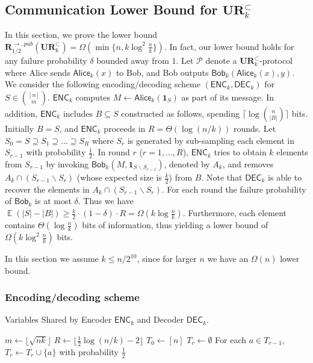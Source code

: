 \documentclass[11pt]{article}
\DeclareMathOperator*{\E}{\mathbb{E}}
\newcommand{\enc}{\textsf{ENC}\xspace}
\newcommand{\dec}{\textsf{DEC}\xspace}
\newcommand{\sketch}{\mathsf{Alice}}
\newcommand{\query}{\mathsf{Bob}}
\newcommand{\ur}{\mathbf{UR}\xspace}
\newcommand{\randcom}{\mathbf{R}}
\begin{document}
\subsection{Communication Lower Bound for $\ur_k^\subset$}\label{sec:k-samples-lb}

In this section, we prove the lower bound $\randcom^{\rightarrow,pub}_{1/2}(\ur^\subset_k) = \Omega(\min\{n, k\log^2 \frac{n}{k}\})$. In fact, our lower bound holds for any failure probability $\delta$ bounded away from $1$. Let $\mathcal{P}$ denote a $\ur_k^\subset$-protocol where Alice sends $\sketch_k(x)$ to Bob, and Bob outputs $\query_k(\sketch_k(x), y)$.  We consider the following encoding/decoding scheme $(\enc_k, \dec_k)$ for $S\in {[n] \choose m}$.  $\enc_k$ computes $M\leftarrow \sketch_k(\mathbf{1}_S)$ as part of its message. In addition, $\enc_k$ includes $B\subseteq S$ constructed as follows, spending $\lceil\log{n\choose |B|}\rceil$ bits.  Initially $B= S$, and $\enc_k$ proceeds in $R=\Theta(\log (n/k))$ rounds.  Let $S_0=S\supseteq S_1\supseteq \ldots \supseteq S_R$ where $S_r$ is generated by sub-sampling each element in $S_{r-1}$ with probability $\frac{1}{2}$.  In round $r$ ($r=1,\ldots, R$), $\enc_k$ tries to obtain $k$ elements from $S_{r-1}$ by invoking $\query_k(M, \mathbf{1}_{S\backslash S_{r-1}})$, denoted by $A_k$, and removes $A_k\cap (S_{r-1}\backslash S_{r})$ (whose expected size is $\frac{k}{2}$) from $B$.  Note that $\dec_k$ is able to recover the elements in $A_k\cap (S_{r-1}\backslash S_{r})$.  For each round the failure probability of $\query_k$ is at most $\delta$.  Thus we have $\E(|S|-|B|)\ge \frac{k}{2}\cdot (1-\delta) \cdot R=\Omega(k\log\frac{n}{k})$.  Furthermore, each element contains $\Theta(\log \frac{n}{k})$ bits of information, thus yielding a lower bound of $\Omega(k\log^2\frac{n}{k})$ bits.

In this section we assume $k \le n/2^{10}$, since for larger $n$ we have an $\Omega(n)$ lower bound.

\subsubsection{Encoding/decoding scheme}
\begin{algorithm}[H] 
  \caption{Variables Shared by Encoder $\enc_k$ and Decoder $\dec_k$.} \label{algo:para4}
  \begin{algorithmic}[1] 
    \State $m\leftarrow \lfloor \sqrt{nk} \rfloor$
    \State $R\leftarrow \lfloor \frac{1}{2}\log (n/k) - 2 \rfloor$ 
    \State $T_0\leftarrow [n]$
      \State $T_r\leftarrow \emptyset$
      \State For each $a\in T_{r-1}$, $T_r\leftarrow T_r\cup \{a\}$ with probability $\frac{1}{2}$ 
    \EndFor
  \end{algorithmic}
\end{algorithm}
\end{document}
